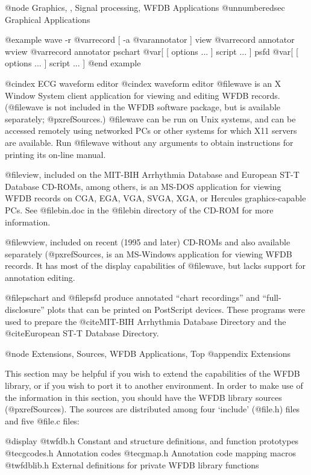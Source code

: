 {{{{{{{{{@node     Graphics, , Signal processing, WFDB Applications
@unnumberedsec Graphical Applications

@example
wave -r @var{record [ }-a @var{annotator ]}
view @var{record annotator}
wview @var{record annotator}
pschart @var{[ [ options ... ] script ... ]}
psfd @var{[ [ options ... ] script ... ]}
@end example

@cindex ECG waveform editor
@cindex waveform editor
@file{wave} is an X Window System client application for viewing
and editing WFDB records.  (@file{wave} is not included in the WFDB software
package, but is available separately; @pxref{Sources}.)  @file{wave} can be
run on Unix systems, and can be accessed remotely using networked PCs or
other systems for which X11 servers are available.  Run @file{wave}
without any arguments to obtain instructions for printing its on-line
manual.

@file{view}, included on the MIT-BIH Arrhythmia Database and European ST-T
Database CD-ROMs, among others, is an MS-DOS application for viewing WFDB
records on CGA, EGA, VGA, SVGA, XGA, or Hercules graphics-capable PCs.  See
@file{bin.doc} in the @file{bin} directory of the CD-ROM for more
information.

@file{wview}, included on recent (1995 and later) CD-ROMs and also
available separately (@pxref{Sources}, is an MS-Windows application for
viewing WFDB records.  It has most of the display capabilities of
@file{wave}, but lacks support for annotation editing.

@file{pschart} and @file{psfd} produce annotated ``chart recordings''
and ``full-disclosure'' plots that can be printed on PostScript devices.
These programs were used to prepare the @cite{MIT-BIH Arrhythmia
Database Directory} and the @cite{European ST-T Database
Directory}.

@node     Extensions, Sources, WFDB Applications, Top
@appendix Extensions

This section may be helpful if you wish to extend the capabilities of
the WFDB library, or if you wish to port it to another environment.  In
order to make use of the information in this section, you should have
the WFDB library sources (@pxref{Sources}).  The sources are distributed
among four `include' (@file{.h}) files and five @file{.c} files:

@display
@t{wfdb.h        } Constant and structure definitions, and function prototypes
@t{ecgcodes.h    } Annotation codes
@t{ecgmap.h      } Annotation code mapping macros
@t{wfdblib.h     } External definitions for private WFDB library functions

}}}}}}}}}
